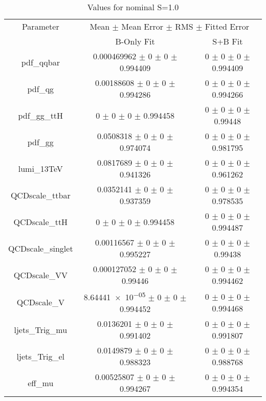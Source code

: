 \begin{table}
\centering
\caption{Values for nominal S=1.0}
\begin{tabular}{ccc}
\toprule
Parameter 	& \multicolumn{2}{c}{Mean $\pm$ Mean Error $\pm$ RMS $\pm$ Fitted Error}\\
 	& B-Only Fit & S+B Fit\\
\midrule
pdf\_qqbar 	& \num{0.000469962} $\pm$ \num{0} $\pm$ \num{0} $\pm$ \num{0.994409} 	& \num{0} $\pm$ \num{0} $\pm$ \num{0} $\pm$ \num{0.994409}\\
pdf\_qg 	& \num{0.00188608} $\pm$ \num{0} $\pm$ \num{0} $\pm$ \num{0.994286} 	& \num{0} $\pm$ \num{0} $\pm$ \num{0} $\pm$ \num{0.994266}\\
pdf\_gg\_ttH 	& \num{0} $\pm$ \num{0} $\pm$ \num{0} $\pm$ \num{0.994458} 	& \num{0} $\pm$ \num{0} $\pm$ \num{0} $\pm$ \num{0.99448}\\
pdf\_gg 	& \num{0.0508318} $\pm$ \num{0} $\pm$ \num{0} $\pm$ \num{0.974074} 	& \num{0} $\pm$ \num{0} $\pm$ \num{0} $\pm$ \num{0.981795}\\
lumi\_13TeV 	& \num{0.0817689} $\pm$ \num{0} $\pm$ \num{0} $\pm$ \num{0.941326} 	& \num{0} $\pm$ \num{0} $\pm$ \num{0} $\pm$ \num{0.961262}\\
QCDscale\_ttbar 	& \num{0.0352141} $\pm$ \num{0} $\pm$ \num{0} $\pm$ \num{0.937359} 	& \num{0} $\pm$ \num{0} $\pm$ \num{0} $\pm$ \num{0.978535}\\
QCDscale\_ttH 	& \num{0} $\pm$ \num{0} $\pm$ \num{0} $\pm$ \num{0.994458} 	& \num{0} $\pm$ \num{0} $\pm$ \num{0} $\pm$ \num{0.994487}\\
QCDscale\_singlet 	& \num{0.00116567} $\pm$ \num{0} $\pm$ \num{0} $\pm$ \num{0.995227} 	& \num{0} $\pm$ \num{0} $\pm$ \num{0} $\pm$ \num{0.99438}\\
QCDscale\_VV 	& \num{0.000127052} $\pm$ \num{0} $\pm$ \num{0} $\pm$ \num{0.99446} 	& \num{0} $\pm$ \num{0} $\pm$ \num{0} $\pm$ \num{0.994462}\\
QCDscale\_V 	& \num{8.64441e-05} $\pm$ \num{0} $\pm$ \num{0} $\pm$ \num{0.994452} 	& \num{0} $\pm$ \num{0} $\pm$ \num{0} $\pm$ \num{0.994468}\\
ljets\_Trig\_mu 	& \num{0.0136201} $\pm$ \num{0} $\pm$ \num{0} $\pm$ \num{0.991402} 	& \num{0} $\pm$ \num{0} $\pm$ \num{0} $\pm$ \num{0.991807}\\
ljets\_Trig\_el 	& \num{0.0149879} $\pm$ \num{0} $\pm$ \num{0} $\pm$ \num{0.988323} 	& \num{0} $\pm$ \num{0} $\pm$ \num{0} $\pm$ \num{0.988768}\\
eff\_mu 	& \num{0.00525807} $\pm$ \num{0} $\pm$ \num{0} $\pm$ \num{0.994267} 	& \num{0} $\pm$ \num{0} $\pm$ \num{0} $\pm$ \num{0.994354}\\

\end{tabular}
\end{table}
